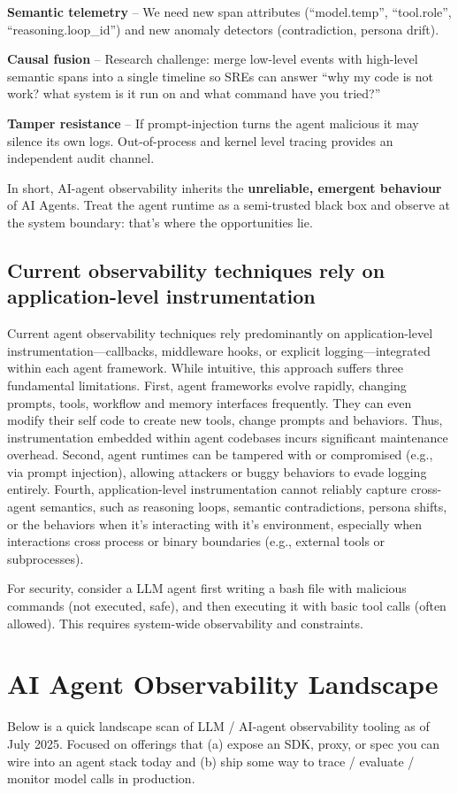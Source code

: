 \documentclass[sigplan,screen，review,9pt]{acmart}
\begin{document}
\textbf{Semantic telemetry} – We need new span attributes (``model.temp'', ``tool.role'', ``reasoning.loop\_id'') and new anomaly detectors (contradiction, persona drift).
    
\textbf{Causal fusion} – Research challenge: merge low-level events with high-level semantic spans into a single timeline so SREs can answer ``why my code is not work? what system is it run on and what command have you tried?''
    
\textbf{Tamper resistance} – If prompt-injection turns the agent malicious it may silence its own logs. Out-of-process and kernel level tracing provides an independent audit channel.

In short, AI-agent observability inherits the \textbf{unreliable, emergent behaviour} of AI Agents. Treat the agent runtime as a semi-trusted black box and observe at the system boundary: that's where the opportunities lie.

\subsection*{Current observability techniques rely on application-level instrumentation}

Current agent observability techniques rely predominantly on application-level instrumentation—callbacks, middleware hooks, or explicit logging—integrated within each agent framework. While intuitive, this approach suffers three fundamental limitations. First, agent frameworks evolve rapidly, changing prompts, tools, workflow and memory interfaces frequently. They can even modify their self code to create new tools, change prompts and behaviors. Thus, instrumentation embedded within agent codebases incurs significant maintenance overhead. Second, agent runtimes can be tampered with or compromised (e.g., via prompt injection), allowing attackers or buggy behaviors to evade logging entirely. Fourth, application-level instrumentation cannot reliably capture cross-agent semantics, such as reasoning loops, semantic contradictions, persona shifts, or the behaviors when it's interacting with it's environment, especially when interactions cross process or binary boundaries (e.g., external tools or subprocesses).

For security, consider a LLM agent first writing a bash file with malicious commands (not executed, safe), and then executing it with basic tool calls (often allowed). This requires system-wide observability and constraints.

\section{AI Agent Observability Landscape}
Below is a quick landscape scan of LLM / AI-agent observability tooling as of July 2025. Focused on offerings that (a) expose an SDK, proxy, or spec you can wire into an agent stack today and (b) ship some way to trace / evaluate / monitor model calls in production.
\end{document}
